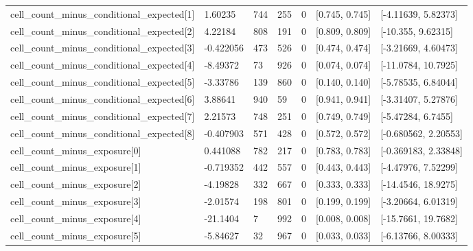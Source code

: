 \begin{longtable}
{}cell\_\allowbreak{}count\_\allowbreak{}minus\_\allowbreak{}conditional\_\allowbreak{}expected[1] & 1.60235 & 744 & 255 & 0 & [0.745, 0.745] & [-4.11639, 5.82373] \\
{}cell\_\allowbreak{}count\_\allowbreak{}minus\_\allowbreak{}conditional\_\allowbreak{}expected[2] & 4.22184 & 808 & 191 & 0 & [0.809, 0.809] & [-10.355, 9.62315] \\
{}cell\_\allowbreak{}count\_\allowbreak{}minus\_\allowbreak{}conditional\_\allowbreak{}expected[3] & -0.422056 & 473 & 526 & 0 & [0.474, 0.474] & [-3.21669, 4.60473] \\
{}cell\_\allowbreak{}count\_\allowbreak{}minus\_\allowbreak{}conditional\_\allowbreak{}expected[4] & -8.49372 & 73 & 926 & 0 & [0.074, 0.074] & [-11.0784, 10.7925] \\
{}cell\_\allowbreak{}count\_\allowbreak{}minus\_\allowbreak{}conditional\_\allowbreak{}expected[5] & -3.33786 & 139 & 860 & 0 & [0.140, 0.140] & [-5.78535, 6.84044] \\
{}cell\_\allowbreak{}count\_\allowbreak{}minus\_\allowbreak{}conditional\_\allowbreak{}expected[6] & 3.88641 & 940 & 59 & 0 & [0.941, 0.941] & [-3.31407, 5.27876] \\
{}cell\_\allowbreak{}count\_\allowbreak{}minus\_\allowbreak{}conditional\_\allowbreak{}expected[7] & 2.21573 & 748 & 251 & 0 & [0.749, 0.749] & [-5.47284, 6.7455] \\
{}cell\_\allowbreak{}count\_\allowbreak{}minus\_\allowbreak{}conditional\_\allowbreak{}expected[8] & -0.407903 & 571 & 428 & 0 & [0.572, 0.572] & [-0.680562, 2.20553] \\
{}cell\_\allowbreak{}count\_\allowbreak{}minus\_\allowbreak{}exposure[0] & 0.441088 & 782 & 217 & 0 & [0.783, 0.783] & [-0.369183, 2.33848] \\
{}cell\_\allowbreak{}count\_\allowbreak{}minus\_\allowbreak{}exposure[1] & -0.719352 & 442 & 557 & 0 & [0.443, 0.443] & [-4.47976, 7.52299] \\
{}cell\_\allowbreak{}count\_\allowbreak{}minus\_\allowbreak{}exposure[2] & -4.19828 & 332 & 667 & 0 & [0.333, 0.333] & [-14.4546, 18.9275] \\
{}cell\_\allowbreak{}count\_\allowbreak{}minus\_\allowbreak{}exposure[3] & -2.01574 & 198 & 801 & 0 & [0.199, 0.199] & [-3.20664, 6.01319] \\
{}cell\_\allowbreak{}count\_\allowbreak{}minus\_\allowbreak{}exposure[4] & -21.1404 & 7 & 992 & 0 & [0.008, 0.008] & [-15.7661, 19.7682] \\
{}cell\_\allowbreak{}count\_\allowbreak{}minus\_\allowbreak{}exposure[5] & -5.84627 & 32 & 967 & 0 & [0.033, 0.033] & [-6.13766, 8.00333] \\

\end{longtable}

